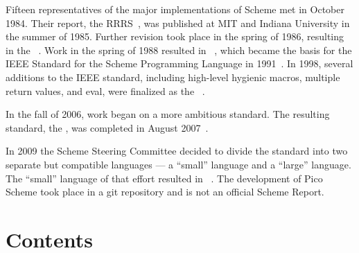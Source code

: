 \vest Fifteen representatives of the major implementations of Scheme
met in October 1984.
Their report, the RRRS~\cite{RRRS},
was published at MIT and Indiana University in the summer of 1985.
Further revision took place in the spring of 1986, resulting in the
\rthreers~\cite{R3RS}.
Work in the spring of 1988 resulted in \rfourrs~\cite{R4RS},
which became the basis for the
IEEE Standard for the Scheme Programming Language in 1991~\cite{IEEEScheme}.
In 1998, several additions to the IEEE standard, including high-level
hygienic macros, multiple return values, and {\cf eval}, were finalized
as the \rfivers~\cite{R5RS}.

In the fall of 2006, work began on a more ambitious standard.
The resulting standard, the
\rsixrs, was completed in August 2007~\cite{R6RS}.

In 2009 the Scheme Steering Committee decided to divide the
standard into two separate but compatible languages --- a ``small''
language and a ``large'' language.
The ``small'' language of that effort resulted in \rsevenrs~\cite{R7RS}.
The development of Pico Scheme took place in a git repository\cite{picogit} and is not an official Scheme Report.


\vfill
\eject

\chapter*{Contents}
\addvspace{3.5pt}                  %
\renewcommand{\tocshrink}{-3.5pt}  %
{\footnotesize
\tableofcontents
}

